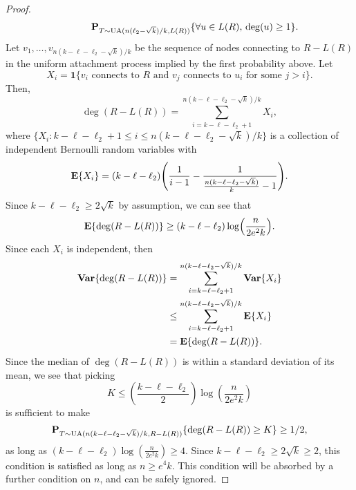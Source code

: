 \begin{proof}
\begin{align*}
    &\qquad \qquad \operatorname{\mathbf{P}}_{T \sim \operatorname{UA}(n(\ell_2 - \sqrt{k})/k, L(R))}\{\forall u \in L(R), \, \deg(u) \ge 1\} .
  \end{align*}
  Let $v_1, \dots, v_{n(k - \ell - \ell_2 - \sqrt{k})/k}$ be the sequence of
  nodes connecting to $R - L(R)$ in the uniform attachment process
  implied by the first probability above. Let
  \[
    X_i = \mathbf{1}\{v_i \text{ connects to } R \text{ and } v_j \text{ connects to } u_i \text{ for some } j > i\} .
  \]
  Then,
  \[
    \deg(R - L(R)) = \sum_{i = k - \ell - \ell_2 + 1}^{n(k - \ell - \ell_2 - \sqrt{k})/k} X_i ,
  \]
  where
  $\{X_i \colon k - \ell - \ell_2 + 1 \le i \le n (k - \ell - \ell_2 -
  \sqrt{k})/k\}$ is a collection of independent Bernoulli random variables
  with
  \[
    \E\{X_i\} = (k - \ell - \ell_2)\left(\frac{1}{i - 1} - \frac{1}{\frac{n(k - \ell - \ell_2 - \sqrt{k})}{k} - 1} \right) .
  \]
  Since $k - \ell - \ell_2 \ge 2\sqrt{k}$ by assumption, we can see
  that
  \[
    \E\{\deg(R - L(R))\} \ge (k - \ell - \ell_2) \log \left(\frac{n}{2 e^2 k}\right) .
  \]
  Since each $X_i$ is independent, then
  \begin{align*}
    \mathbf{Var}\{\deg(R - L(R))\} &= \sum_{i = k - \ell - \ell_2 + 1}^{n(k - \ell - \ell_2 - \sqrt{k})/k} \mathbf{Var}\{X_i\} \\
                         &\le \sum_{i = k - \ell - \ell_2 + 1}^{n(k - \ell - \ell_2 - \sqrt{k})/k} \operatorname{\mathbf{E}}\{X_i\} \\
                         &= \operatorname{\mathbf{E}}\{\deg(R - L(R))\} .
  \end{align*}
  Since the median of $\deg(R - L(R))$ is within a standard deviation
  of its mean, we see that picking
  \[
    K \le \left(\frac{k - \ell - \ell_2}{2}\right) \log
    \left(\frac{n}{2 e^2 k} \right)
  \]
  is sufficient to make
  \[
    \operatorname{\mathbf{P}}_{T \sim \operatorname{UA}(n(k - \ell - \ell_2 - \sqrt{k})/k, R - L(R))}\{\deg(R - L(R)) \ge K\} \ge 1/2 ,
  \]
  as long as
  $(k - \ell - \ell_2) \log \left(\frac{n}{2 e^2 k}\right) \ge
  4$. Since $k - \ell - \ell_2 \ge 2 \sqrt{k} \ge 2$, this condition
  is satisfied as long as $n \ge e^4 k$. This condition will be
  absorbed by a further condition on $n$, and can be safely ignored.


\end{proof}
